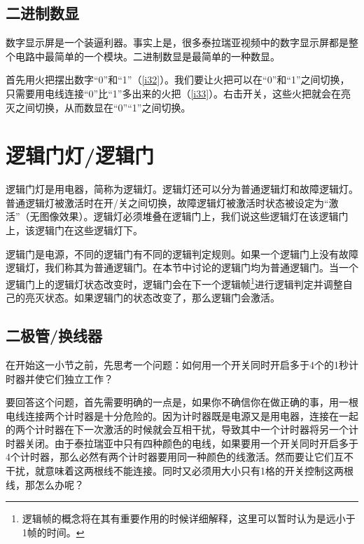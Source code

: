 \subsection{二进制数显}

数字显示屏是一个装逼利器。事实上是，很多泰拉瑞亚视频中的数字显示屏都是整个电路中最简单的一个模块。二进制数显是最简单的一种数显。

首先用火把摆出数字“0”和“1”（\autoref{i32}）。我们要让火把可以在“0”和“1”之间切换，只需要用电线连接“0”比“1”多出来的火把（\autoref{i33}）。右击开关，这些火把就会在亮灭之间切换，从而数显在“0”“1”之间切换。

\begin{figure}[!h]
\begin{center}
\qquad\qquad
{}
\end{center}
\caption{}
\label{i32:33}
\end{figure}

\section{逻辑门灯/逻辑门}

逻辑门灯是用电器，简称为逻辑灯。逻辑灯还可以分为普通逻辑灯和故障逻辑灯。普通逻辑灯被激活时在开/关之间切换，故障逻辑灯被激活时状态被设定为“激活”（无图像效果）。逻辑灯必须堆叠在逻辑门上，我们说这些逻辑灯在该逻辑门上，该逻辑门在这些逻辑灯下。

逻辑门是电源，不同的逻辑门有不同的逻辑判定规则。如果一个逻辑门上没有故障逻辑灯，我们称其为普通逻辑门。在本节中讨论的逻辑门均为普通逻辑门。当一个逻辑门上的逻辑灯状态改变时，逻辑门会在下一个逻辑帧\footnote{逻辑帧的概念将在其有重要作用的时候详细解释，这里可以暂时认为是远小于1帧的时间。}进行逻辑判定并调整自己的亮灭状态。如果逻辑门的状态改变了，那么逻辑门会激活。

\subsection{二极管/换线器}

在开始这一小节之前，先思考一个问题：如何用一个开关同时开启多于4个的1秒计时器并使它们独立工作？

要回答这个问题，首先需要明确的一点是，如果你不确信你在做正确的事，用一根电线连接两个计时器是十分危险的。因为计时器既是电源又是用电器，连接在一起的两个计时器在下一次激活的时候就会互相干扰，导致其中一个计时器将另一个计时器关闭。由于泰拉瑞亚中只有四种颜色的电线，如果要用一个开关同时开启多于4个计时器，那么必然有两个计时器要用同一种颜色的线激活。然而要让它们互不干扰，就意味着这两根线不能连接。同时又必须用大小只有1格的开关控制这两根线，那怎么办呢？

